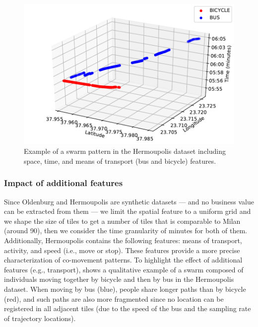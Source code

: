 \documentclass[
]{ceurart}
\renewcommand{\sf}[1]{\textsf{\textup{#1}}}
\begin{document}
\begin{figure}[t]
    \centering
    \includegraphics[scale=.55]{hermoupolis.pdf}
    \caption{Example of a swarm pattern in the \sf{Hermoupolis} dataset including space, time, and means of transport (bus and bicycle) features.}
    \label{fig:hermoupolis}
\end{figure}

\subsubsection{Impact of additional features}
Since \sf{Oldenburg} and \sf{Hermoupolis} are synthetic datasets --- and no business value can be extracted from them --- we limit the spatial feature to a uniform grid and we shape the size of tiles to get a number of tiles that is comparable to \sf{Milan} (around 90), then we consider the time granularity of minutes for both of them.
Additionally, \sf{Hermoupolis} contains the following features: means of transport, activity, and speed (i.e., move or stop).
These features provide a more precise characterization of co-movement patterns.
To highlight the effect of additional features (e.g., transport),  shows a qualitative example of a swarm composed of individuals moving together by bicycle and then by bus in the \sf{Hermoupolis} dataset.
When moving by bus (blue), people share longer paths than by bicycle (red), and such paths are also more fragmented since no location can be registered in all adjacent tiles (due to the speed of the bus and the sampling rate of trajectory locations). 
\end{document}
